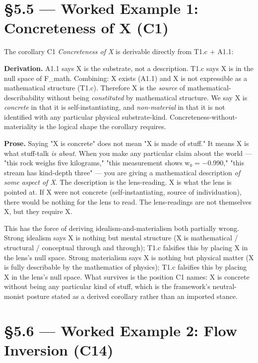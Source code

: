 \documentclass[11pt, openany]{book}
\newcommand{\sectionbreak}{\clearpage}
\begin{document}
\sectionbreak

\section{§5.5 --- Worked Example 1: Concreteness of X (C1)}

The corollary C1 \textit{Concreteness of X} is derivable directly from T1.c + A1.1:

\textbf{Derivation.} A1.1 says X is the substrate, not a description. T1.c says X is in the null space of F\_\allowbreak{}math. Combining: X exists (A1.1) and X is not expressible as a mathematical structure (T1.c). Therefore X is the \textit{source} of mathematical-describability without being \textit{constituted} by mathematical structure. We say X is \textit{concrete} in that it is self-instantiating, and \textit{non-material} in that it is not identified with any particular physical substrate-kind. Concreteness-without-materiality is the logical shape the corollary requires.

\textbf{Prose.} Saying "X is concrete" does not mean "X is made of stuff." It means X is what stuff-talk \textit{is about}. When you make any particular claim about the world --- "this rock weighs five kilograms," "this measurement shows w₀ = −0.990," "this stream has kind-depth three" --- you are giving a mathematical description \textit{of some aspect of X}. The description is the lens-reading. X is what the lens is pointed at. If X were not concrete (self-instantiating, source of individuation), there would be nothing for the lens to read. The lens-readings are not themselves X, but they require X.

This has the force of deriving idealism-and-materialism both partially wrong. Strong idealism says X is nothing but mental structure (X is mathematical / structural / conceptual through and through); T1.c falsifies this by placing X in the lens's null space. Strong materialism says X is nothing but physical matter (X is fully describable by the mathematics of physics); T1.c falsifies this by placing X in the lens's null space. What survives is the position C1 names: X is concrete without being any particular kind of stuff, which is the framework's neutral-monist posture stated as a derived corollary rather than an imported stance.

\sectionbreak

\section{§5.6 --- Worked Example 2: Flow Inversion (C14)}
\end{document}
